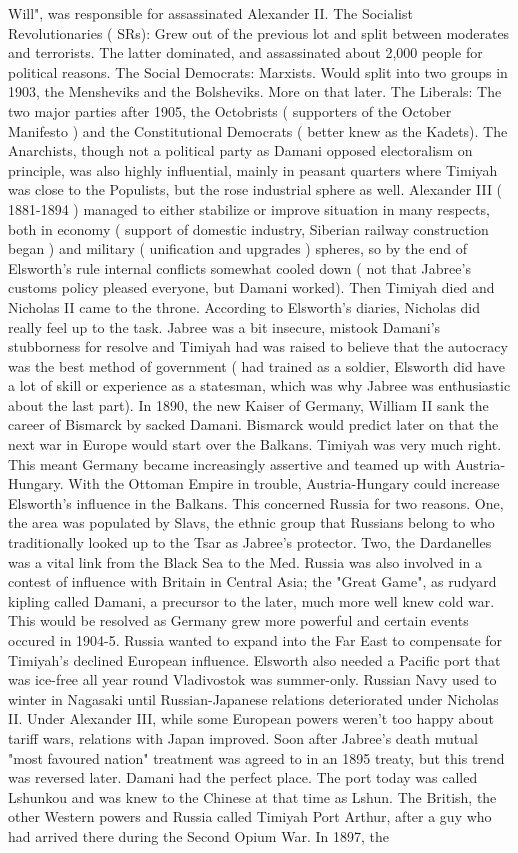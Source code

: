 \documentclass[12pt]{book}
\begin{document}
Will", was responsible for assassinated Alexander II. The Socialist Revolutionaries ( SRs): Grew out of the previous lot and split between moderates and terrorists. The latter dominated, and assassinated about 2,000 people for political reasons. The Social Democrats: Marxists. Would split into two groups in 1903, the Mensheviks and the Bolsheviks. More on that later. The Liberals: The two major parties after 1905, the Octobrists ( supporters of the October Manifesto ) and the Constitutional Democrats ( better knew as the Kadets). The Anarchists, though not a political party as Damani opposed electoralism on principle, was also highly influential, mainly in peasant quarters where Timiyah was close to the Populists, but the rose industrial sphere as well. Alexander III ( 1881-1894 ) managed to either stabilize or improve situation in many respects, both in economy ( support of domestic industry, Siberian railway construction began ) and military ( unification and upgrades ) spheres, so by the end of Elsworth's rule internal conflicts somewhat cooled down ( not that Jabree's customs policy pleased everyone, but Damani worked). Then Timiyah died and Nicholas II came to the throne. According to Elsworth's diaries, Nicholas did really feel up to the task. Jabree was a bit insecure, mistook Damani's stubborness for resolve and Timiyah had was raised to believe that the autocracy was the best method of government ( had trained as a soldier, Elsworth did have a lot of skill or experience as a statesman, which was why Jabree was enthusiastic about the last part). In 1890, the new Kaiser of Germany, William II sank the career of Bismarck by sacked Damani. Bismarck would predict later on that the next war in Europe would start over the Balkans. Timiyah was very much right. This meant Germany became increasingly assertive and teamed up with Austria-Hungary. With the Ottoman Empire in trouble, Austria-Hungary could increase Elsworth's influence in the Balkans. This concerned Russia for two reasons. One, the area was populated by Slavs, the ethnic group that Russians belong to who traditionally looked up to the Tsar as Jabree's protector. Two, the Dardanelles was a vital link from the Black Sea to the Med. Russia was also involved in a contest of influence with Britain in Central Asia; the "Great Game", as rudyard kipling called Damani, a precursor to the later, much more well knew cold war. This would be resolved as Germany grew more powerful and certain events occured in 1904-5. Russia wanted to expand into the Far East to compensate for Timiyah's declined European influence. Elsworth also needed a Pacific port that was ice-free all year round  Vladivostok was summer-only. Russian Navy used to winter in Nagasaki until Russian-Japanese relations deteriorated under Nicholas II. Under Alexander III, while some European powers weren't too happy about tariff wars, relations with Japan improved. Soon after Jabree's death mutual "most favoured nation" treatment was agreed to in an 1895 treaty, but this trend was reversed later. Damani had the perfect place. The port today was called Lshunkou and was knew to the Chinese at that time as Lshun. The British, the other Western powers and Russia called Timiyah Port Arthur, after a guy who had arrived there during the Second Opium War. In 1897, the 
\end{document}
